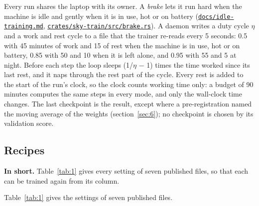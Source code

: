 \documentclass[10pt]{article}
\begin{document}
Every run shares the laptop with its owner. A \emph{brake} lets it run hard when the machine is idle and gently when it is in use, hot or on battery (\href{https://github.com/maxgfr/skycmd/blob/main/docs/idle-training.md}{\texttt{docs/\allowbreak{}idle-training.md}}, \href{https://github.com/maxgfr/skycmd/blob/main/crates/sky-train/src/brake.rs}{\texttt{crates/\allowbreak{}sky-train/\allowbreak{}src/\allowbreak{}brake.rs}}). A daemon writes a duty cycle $\eta$ and a work and rest cycle to a file that the trainer re-reads every 5 seconds: 0.5 with 45 minutes of work and 15 of rest when the machine is in use, hot or on battery, 0.85 with 50 and 10 when it is left alone, and 0.95 with 55 and 5 at night. Before each step the loop sleeps (1/$\eta$ $-$ 1) times the time worked since its last rest, and it naps through the rest part of the cycle. Every rest is added to the start of the run's clock, so the clock counts working time only: a budget of 90 minutes computes the same steps in every mode, and only the wall-clock time changes. The last checkpoint is the result, except where a pre-registration named the moving average of the weights (section~\ref{sec:6}); no checkpoint is chosen by its validation score.

\subsection{Recipes}\label{sec:4.7}

\textbf{In short.} Table~\ref{tab:1} gives every setting of seven published files, so that each can be trained again from its column.

Table~\ref{tab:1} gives the settings of seven published files.
\end{document}
